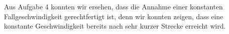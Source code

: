 \documentclass[a4paper,german,12pt,smallheadings]{scrartcl}
\begin{document}
Aus Aufgabe 4 konnten wir ersehen, dass die Annahme einer konstanten
Fallgeschwindigkeit gerechtfertigt ist, denn wir konnten zeigen, dass eine
konstante Geschwindigkeit bereits nach sehr kurzer Strecke erreicht wird.

\begin{landscape}
  
\end{landscape}
\end{document}
